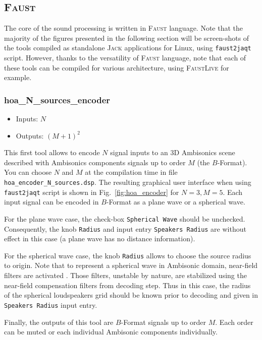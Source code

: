 \documentclass[10pt,a4paper]{article}
\begin{document}
\subsection{\textsc{Faust}}
The core of the sound processing is written in \textsc{Faust} language. Note that the majority of the figures presented in the following section will be screen-shots of the tools compiled as standalone \textsc{Jack} applications for Linux, using \lstinline'faust2jaqt' script. However, thanks to the versatility of \textsc{Faust} language, note that each of these tools can be compiled for various architecture, using \textsc{FaustLive} for example. 

\pagebreak
\subsubsection{hoa\_N\_sources\_encoder}
\label{sec:hoa_encoder}
\begin{itemize}
\item Inputs: $N$
\item Outputs: $(M+1)^2$
\end{itemize}

This first tool allows to encode $N$ signal inputs to an 3D Ambisonics scene described with Ambisonics components signals up to order $M$ (the $B$-Format). You can choose $N$ and $M$ at the compilation time in file \lstinline'hoa_encoder_N_sources.dsp'. The resulting graphical user interface when using \lstinline'faust2jaqt' script is shown in Fig.~\ref{fig:hoa_encoder} for $N=3, M=5$.
Each input signal can be encoded in $B$-Format as a plane wave or a spherical wave. 

For the plane wave case, the check-box \lstinline'Spherical Wave' should be unchecked. Consequently, the knob \lstinline'Radius' and input entry \lstinline'Speakers Radius' are without effect in this case (a plane wave has no distance information).

For the spherical wave case, the knob \lstinline'Radius' allows to choose the source radius to origin. Note that to represent a spherical wave in Ambisonic domain, near-field filters are activated \cite{daniel2003spatial,lecomte2015real}. Those filters, unstable by nature, are stabilized using the near-field compensation filters from decoding step. Thus in this case, the radius of the spherical loudspeakers grid should be known prior to decoding and given in \lstinline'Speakers Radius' input entry.

Finally, the outputs of this tool are $B$-Format signals up to order $M$. Each order can be muted or each individual Ambisonic components individually.
\end{document}
